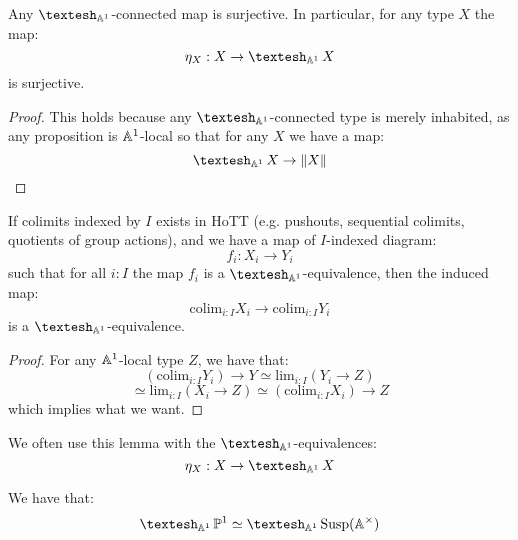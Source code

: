 \begin{lemma}
Any $\shape_{\A^1}$-connected map is surjective. In particular, for any type $X$ the map:
\[\eta_X:X\to \shape_{\A^1}X\]
is surjective.
\end{lemma}

\begin{proof}
This holds because any $\shape_{\A^1}$-connected type is merely inhabited, as any proposition is $\mathbb{A}^1$-local so that for any $X$ we have a map:
\[\shape_{\A^1}X \to \propTrunc{X}\]
\end{proof}



\begin{lemma}\label{colimit-shape}
If colimits indexed by $I$ exists in HoTT (e.g. pushouts, sequential colimits, quotients of group actions), and we have a map of $I$-indexed diagram:
\[f_i : X_i \to Y_i\]
such that for all $i:I$ the map $f_i$ is a $\shape_{\A^1}$-equivalence, then the induced map: 
\[\mathrm{colim}_{i:I} X_i \to \mathrm{colim}_{i:I} Y_i\]
is a $\shape_{\A^1}$-equivalence.
\end{lemma}

\begin{proof}
For any $\mathbb{A}^1$-local type $Z$, we have that:
\[(\mathrm{colim}_{i:I} Y_i) \to Y \simeq \mathrm{lim}_{i:I} (Y_i \to Z)\]
\[\simeq \mathrm{lim}_{i:I} (X_i \to Z) \simeq (\mathrm{colim}_{i:I} X_i) \to Z\]
which implies what we want.
\end{proof}

We often use this lemma with the $\shape_{\A^1}$-equivalences:
\[\eta_X : X \to \shape_{\A^1} X\]

\begin{proposition}
We have that:
\[\shape_{\A^1} \bP^1 \simeq \shape_{\A^1} \Susp(\A^\times)\]
\end{proposition}

